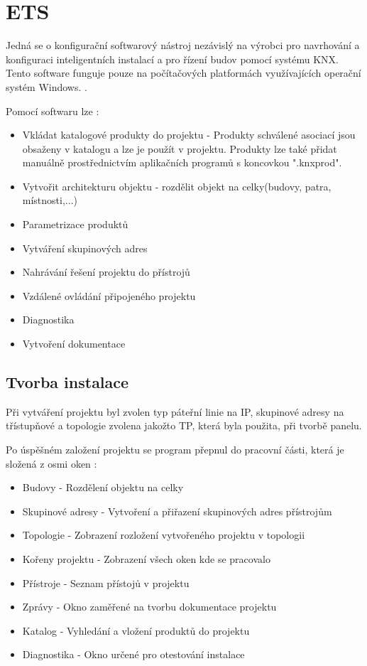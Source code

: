 \chapter{ETS}
\label{ETS}
Jedná se o konfigurační softwarový nástroj nezávislý na výrobci pro navrhování a konfiguraci inteligentních instalací a pro řízení budov pomocí systému KNX. Tento software funguje pouze na počítačových platformách využívajících operační systém Windows. \cite{ETS_Kecy}.

Pomocí softwaru lze \cite{Mitrenga}:
\begin{itemize}
    \item Vkládat katalogové produkty do projektu - Produkty schválené asociací jsou obsaženy v katalogu a lze je použít v projektu. Produkty lze také přidat manuálně prostřednictvím aplikačních programů s koncovkou ".knxprod".
    \item Vytvořit architekturu objektu - rozdělit objekt na celky(budovy, patra, místnosti,...)
    \item Parametrizace produktů
    \item Vytváření skupinových adres
    \item Nahrávání řešení projektu do přístrojů
    \item Vzdálené ovládání připojeného projektu
    \item Diagnostika
    \item Vytvoření dokumentace
\end{itemize}

\section{Tvorba instalace}
Při vytváření projektu byl zvolen typ páteřní linie na IP, skupinové adresy na třístupňové a topologie zvolena jakožto TP, která byla použita, při tvorbě panelu.

Po úspěšném založení projektu se program přepnul do pracovní části, která je složená z osmi oken \cite{Mitrenga}:
\begin{itemize}
    \item Budovy - Rozdělení objektu na celky
    \item Skupinové adresy - Vytvoření a přiřazení skupinových adres přístrojům
    \item Topologie - Zobrazení rozložení vytvořeného projektu v topologii
    \item Kořeny projektu - Zobrazení všech oken kde se pracovalo
    \item Přístroje - Seznam přístojů v projektu
    \item Zprávy - Okno zaměřené na tvorbu dokumentace projektu
    \item Katalog - Vyhledání a vložení produktů do projektu
    \item Diagnostika - Okno určené pro otestování instalace\\
\end{itemize}


